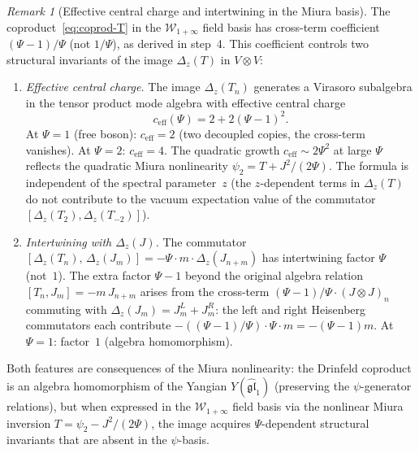 \documentclass[11pt,reqno]{amsart}
\theoremstyle{definition}
\theoremstyle{remark}
\newtheorem{remark}[theorem]{Remark}
\newcommand{\cW}{\mathcal{W}}
\numberwithin{equation}{section}
\begin{document}
\begin{remark}[Effective central charge and intertwining
in the Miura basis]
\label{rem:spin2-ceff-miura}
The coproduct~\eqref{eq:coprod-T} in the
$\cW_{1+\infty}$ field basis has cross-term coefficient
$(\Psi - 1)/\Psi$ (not $1/\Psi$), as derived in step~4.
This coefficient controls two structural invariants of the
image $\Delta_z(T)$ in $V \otimes V$:
\begin{enumerate}[label=\textup{(\arabic*)}]
\item \emph{Effective central charge.}
  The image $\Delta_z(T_n)$ generates a Virasoro
  subalgebra in the tensor product mode algebra with
  effective central charge
  \begin{equation}\label{eq:c-eff-spin2}
    c_{\mathrm{eff}}(\Psi) = 2 + 2(\Psi - 1)^2.
  \end{equation}
  At $\Psi = 1$ (free boson): $c_{\mathrm{eff}} = 2$
  (two decoupled copies, the cross-term vanishes).
  At $\Psi = 2$: $c_{\mathrm{eff}} = 4$.
  The quadratic growth $c_{\mathrm{eff}} \sim 2\Psi^2$ at
  large $\Psi$ reflects the quadratic Miura nonlinearity
  $\psi_2 = T + J^2/(2\Psi)$.
  The formula is independent of the spectral parameter~$z$
  (the $z$-dependent terms in $\Delta_z(T)$ do not
  contribute to the vacuum expectation value of the
  commutator $[\Delta_z(T_2), \Delta_z(T_{-2})]$).
\item \emph{Intertwining with $\Delta_z(J)$.}
  The commutator
  $[\Delta_z(T_n),\, \Delta_z(J_m)]
  = -\Psi \cdot m \cdot \Delta_z(J_{n+m})$
  has intertwining factor $\Psi$ (not~$1$).
  The extra factor $\Psi - 1$ beyond the original algebra
  relation $[T_n, J_m] = -m\,J_{n+m}$ arises from the
  cross-term $(\Psi - 1)/\Psi \cdot (J \otimes J)_n$
  commuting with $\Delta_z(J_m) = J_m^L + J_m^R$:
  the left and right Heisenberg commutators each contribute
  $-((\Psi-1)/\Psi) \cdot \Psi \cdot m = -(\Psi - 1)m$.
  At $\Psi = 1$: factor~$1$ (algebra homomorphism).
\end{enumerate}
Both features are consequences of the Miura nonlinearity:
the Drinfeld coproduct is an algebra homomorphism of the
Yangian $Y(\widehat{\mathfrak{gl}}_1)$ (preserving the
$\psi$-generator relations), but when expressed in the
$\cW_{1+\infty}$ field basis via the nonlinear Miura
inversion $T = \psi_2 - J^2/(2\Psi)$, the image acquires
$\Psi$-dependent structural invariants that are absent in
the $\psi$-basis.
\end{remark}
\end{document}
